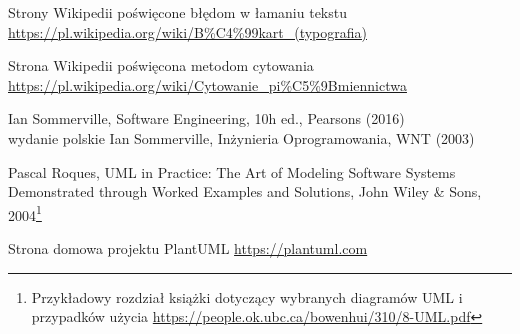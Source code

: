 \documentclass[12pt,a4paper]{article}
\begin{document}
 Strony Wikipedii poświęcone błędom w łamaniu tekstu\\
\url{https://pl.wikipedia.org/wiki/B%C4%99kart_(typografia)}

 Strona Wikipedii poświęcona metodom cytowania \\
\url{https://pl.wikipedia.org/wiki/Cytowanie_pi%C5%9Bmiennictwa}

 Ian Sommerville, Software Engineering, 10h ed., Pearsons  (2016)\\
 wydanie polskie Ian Sommerville, Inżynieria Oprogramowania, WNT (2003)

 Pascal Roques, UML in Practice: The Art of Modeling Software Systems Demonstrated through Worked Examples and Solutions, John Wiley \& Sons, 2004\footnote{
    Przykładowy rozdział książki dotyczący wybranych diagramów UML i przypadków użycia \url{https://people.ok.ubc.ca/bowenhui/310/8-UML.pdf}}

 Strona domowa projektu PlantUML \url{https://plantuml.com}
\end{document}
